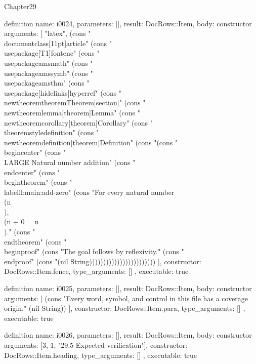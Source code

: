 \begin{lexlean}{Chapter29}
\begin{semanticmodule}
definition{
  name: i0024,
  parameters: [],
  result: DocRows::Item,
  body: constructor{
    arguments: [
      "latex",
      (cons "\\documentclass[11pt]{article}" (cons "\\usepackage[T1]{fontenc}" (cons "\\usepackage{amsmath}" (cons "\\usepackage{amssymb}" (cons "\\usepackage{amsthm}" (cons "\\usepackage[hidelinks]{hyperref}" (cons "\\newtheorem{theorem}{Theorem}[section]" (cons "\\newtheorem{lemma}[theorem]{Lemma}" (cons "\\newtheorem{corollary}[theorem]{Corollary}" (cons "\\theoremstyle{definition}" (cons "\\newtheorem{definition}[theorem]{Definition}" (cons "\" (cons "\\begin{center}" (cons "{\\LARGE Natural number addition}" (cons "\\end{center}" (cons "\\begin{theorem}" (cons "\\label{ll:main:add-zero}" (cons "For every natural number \\(n\\), \\(n + 0 = n\\)." (cons "\\end{theorem}" (cons "\\begin{proof}" (cons "The goal follows by reflexivity." (cons "\\end{proof}" (cons "\" (nil String))))))))))))))))))))))))
    ],
    constructor: DocRows::Item.fence,
    type_arguments: []
  },
  executable: true
}

definition{
  name: i0025,
  parameters: [],
  result: DocRows::Item,
  body: constructor{
    arguments: [
      (cons "Every word, symbol, and control in this file has a coverage origin." (nil String))
    ],
    constructor: DocRows::Item.para,
    type_arguments: []
  },
  executable: true
}

definition{
  name: i0026,
  parameters: [],
  result: DocRows::Item,
  body: constructor{
    arguments: [3, 1, "29.5 Expected verification"],
    constructor: DocRows::Item.heading,
    type_arguments: []
  },
  executable: true
}


\end{semanticmodule}
\end{lexlean}
